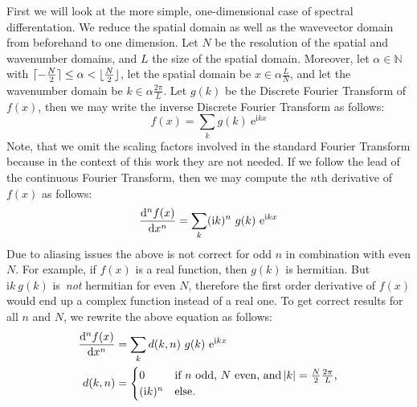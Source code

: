 First we will look at the more simple, one-dimensional case of spectral
differentation. We reduce the spatial domain as well as the wavevector domain
from beforehand to one dimension. Let $N$ be the resolution of the spatial
and wavenumber domains, and $L$ the size of the spatial domain. Moreover, let
$\alpha \in \mathbb{N}$ with $\lceil-\frac{N}{2}\rceil \leq \alpha < \lfloor\frac{N}{2}\rfloor$,
let the spatial domain be $x \in \alpha \frac{L}{N}$, and let the wavenumber
domain be $k \in \alpha \frac{2\pi}{L}$. Let $g(k)$ be the Discrete Fourier
Transform of $f(x)$, then we may write the inverse Discrete Fourier Transform
as follows:
\begin{equation}
 f(x) = \sum_{k}g(k)~\mathrm{e}^{\mathrm{i}kx}
\end{equation}
Note, that we omit the scaling factors involved in the standard Fourier Transform
because in the context of this work they are not needed. If we follow the
lead of the continuous Fourier Transform, then we may compute the $n$th
derivative of $f(x)$ as follows:
\begin{equation}
  \dod[n]{f(x)}{x} = \sum_{k}(\mathrm{i}k)^n~g(k)~\mathrm{e}^{\mathrm{i}kx}
\end{equation}
Due to aliasing issues the above is not correct for odd $n$ in combination
with even $N$. For example, if $f(x)$ is a real function, then $g(k)$ is hermitian.
But $\mathrm{i}k~g(k)$ is~\emph{not} hermitian for even $N$, therefore the first
order derivative of $f(x)$ would end up a complex function instead of a real one.
To get correct results for all $n$ and $N$, we rewrite the above equation as follows:
\begin{align}
\label{eq:dft_derivative}
  \dod[n]{f(x)}{x} &= \sum_{k}d(k, n)~g(k)~\mathrm{e}^{\mathrm{i}kx} \\
\label{eq:dft_derivative_correction}
  d(k, n) &= \begin{cases}
                   0 &\text{if $n$ odd, $N$ even, and $\abs{k} 
= \frac{N}{2}\frac{2\pi}{L}$,} \\
                   (\mathrm{i}k)^n &\text{else.}
                   \end{cases}
\end{align}
%
